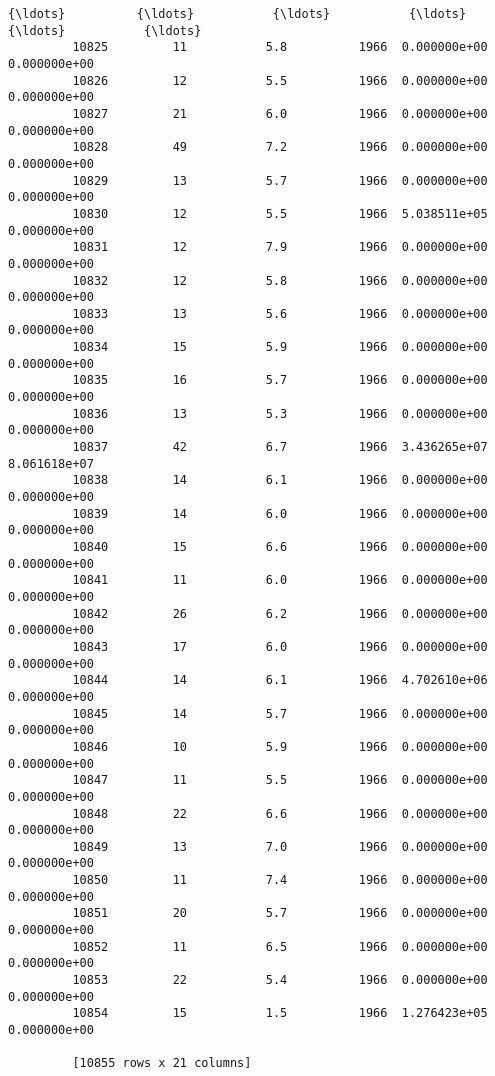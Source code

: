 \documentclass[11pt]{article}
\begin{document}
\begin{Verbatim}[commandchars=\\\{\}]
         {\ldots}          {\ldots}           {\ldots}           {\ldots}           {\ldots}           {\ldots}  
         10825         11           5.8          1966  0.000000e+00  0.000000e+00  
         10826         12           5.5          1966  0.000000e+00  0.000000e+00  
         10827         21           6.0          1966  0.000000e+00  0.000000e+00  
         10828         49           7.2          1966  0.000000e+00  0.000000e+00  
         10829         13           5.7          1966  0.000000e+00  0.000000e+00  
         10830         12           5.5          1966  5.038511e+05  0.000000e+00  
         10831         12           7.9          1966  0.000000e+00  0.000000e+00  
         10832         12           5.8          1966  0.000000e+00  0.000000e+00  
         10833         13           5.6          1966  0.000000e+00  0.000000e+00  
         10834         15           5.9          1966  0.000000e+00  0.000000e+00  
         10835         16           5.7          1966  0.000000e+00  0.000000e+00  
         10836         13           5.3          1966  0.000000e+00  0.000000e+00  
         10837         42           6.7          1966  3.436265e+07  8.061618e+07  
         10838         14           6.1          1966  0.000000e+00  0.000000e+00  
         10839         14           6.0          1966  0.000000e+00  0.000000e+00  
         10840         15           6.6          1966  0.000000e+00  0.000000e+00  
         10841         11           6.0          1966  0.000000e+00  0.000000e+00  
         10842         26           6.2          1966  0.000000e+00  0.000000e+00  
         10843         17           6.0          1966  0.000000e+00  0.000000e+00  
         10844         14           6.1          1966  4.702610e+06  0.000000e+00  
         10845         14           5.7          1966  0.000000e+00  0.000000e+00  
         10846         10           5.9          1966  0.000000e+00  0.000000e+00  
         10847         11           5.5          1966  0.000000e+00  0.000000e+00  
         10848         22           6.6          1966  0.000000e+00  0.000000e+00  
         10849         13           7.0          1966  0.000000e+00  0.000000e+00  
         10850         11           7.4          1966  0.000000e+00  0.000000e+00  
         10851         20           5.7          1966  0.000000e+00  0.000000e+00  
         10852         11           6.5          1966  0.000000e+00  0.000000e+00  
         10853         22           5.4          1966  0.000000e+00  0.000000e+00  
         10854         15           1.5          1966  1.276423e+05  0.000000e+00  
         
         [10855 rows x 21 columns]
\end{Verbatim}
            
\end{document}
